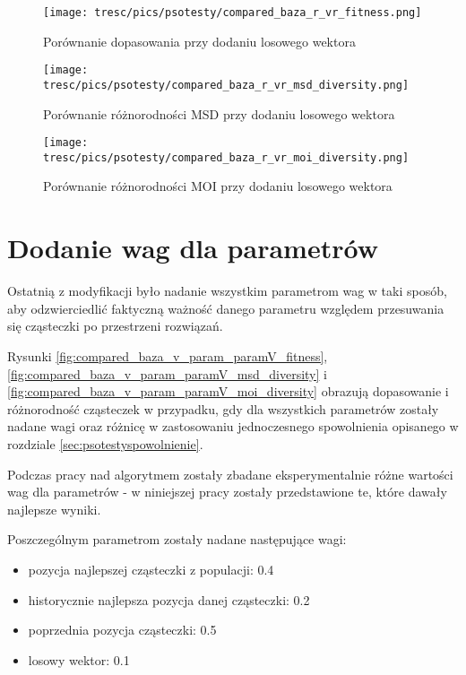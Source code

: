 \clearpage

\begin{figure}[H]
\begin{center} 
\texttt{[image: tresc/pics/psotesty/compared\_baza\_r\_vr\_fitness.png]}
\caption{Porównanie dopasowania przy dodaniu losowego wektora}
\label{fig:compared_baza_r_vr_fitness}
\end{center}
\end{figure}

\begin{figure}[H]
\begin{center} 
\texttt{[image: tresc/pics/psotesty/compared\_baza\_r\_vr\_msd\_diversity.png]}
\caption{Porównanie różnorodności MSD przy dodaniu losowego wektora}
\label{fig:compared_baza_r_vr_msd_diversity}
\end{center}
\end{figure}

\begin{figure}[H]
\begin{center} 
\texttt{[image: tresc/pics/psotesty/compared\_baza\_r\_vr\_moi\_diversity.png]}
\caption{Porównanie różnorodności MOI przy dodaniu losowego wektora}
\label{fig:compared_baza_r_vr_moi_diversity}
\end{center}
\end{figure}



\section{Dodanie wag dla parametrów}

Ostatnią z modyfikacji było nadanie wszystkim parametrom wag w taki sposób, aby odzwierciedlić faktyczną  ważność danego parametru względem przesuwania się cząsteczki po przestrzeni rozwiązań.

Rysunki \ref{fig:compared_baza_v_param_paramV_fitness}, \ref{fig:compared_baza_v_param_paramV_msd_diversity} i \ref{fig:compared_baza_v_param_paramV_moi_diversity} obrazują dopasowanie i różnorodność cząsteczek w przypadku, gdy dla wszystkich parametrów zostały nadane wagi oraz różnicę w zastosowaniu jednoczesnego spowolnienia opisanego w rozdziale \ref{sec:psotestyspowolnienie}. 

Podczas pracy nad algorytmem zostały zbadane eksperymentalnie różne wartości wag dla parametrów - w niniejszej pracy zostały przedstawione te, które dawały najlepsze wyniki.

Poszczególnym parametrom zostały nadane następujące wagi:
\begin{itemize}
\item pozycja najlepszej cząsteczki z populacji: 0.4
\item historycznie najlepsza pozycja danej cząsteczki: 0.2
\item poprzednia pozycja cząsteczki: 0.5
\item losowy wektor: 0.1
\end{itemize}


